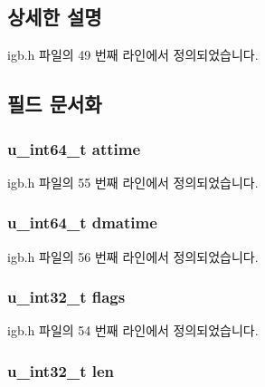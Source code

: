 \subsection{상세한 설명}


igb.\+h 파일의 49 번째 라인에서 정의되었습니다.



\subsection{필드 문서화}
\subsubsection[{\texorpdfstring{attime}{attime}}]{\setlength{\rightskip}{0pt plus 5cm}u\+\_\+int64\+\_\+t attime}\hypertarget{structigb__packet_a7f67203ca8a69ba9e8d49e1233601ff6}{}\label{structigb__packet_a7f67203ca8a69ba9e8d49e1233601ff6}


igb.\+h 파일의 55 번째 라인에서 정의되었습니다.

\subsubsection[{\texorpdfstring{dmatime}{dmatime}}]{\setlength{\rightskip}{0pt plus 5cm}u\+\_\+int64\+\_\+t dmatime}\hypertarget{structigb__packet_a72ee6ebc78f9345554cf78b10226b87f}{}\label{structigb__packet_a72ee6ebc78f9345554cf78b10226b87f}


igb.\+h 파일의 56 번째 라인에서 정의되었습니다.

\subsubsection[{\texorpdfstring{flags}{flags}}]{\setlength{\rightskip}{0pt plus 5cm}u\+\_\+int32\+\_\+t flags}\hypertarget{structigb__packet_a38a8a1678784eecc1ffcc0685dbcce97}{}\label{structigb__packet_a38a8a1678784eecc1ffcc0685dbcce97}


igb.\+h 파일의 54 번째 라인에서 정의되었습니다.

\subsubsection[{\texorpdfstring{len}{len}}]{\setlength{\rightskip}{0pt plus 5cm}u\+\_\+int32\+\_\+t len}\hypertarget{structigb__packet_a0c5f469bd681fb46e6f4203d5338e99f}{}\label{structigb__packet_a0c5f469bd681fb46e6f4203d5338e99f}


